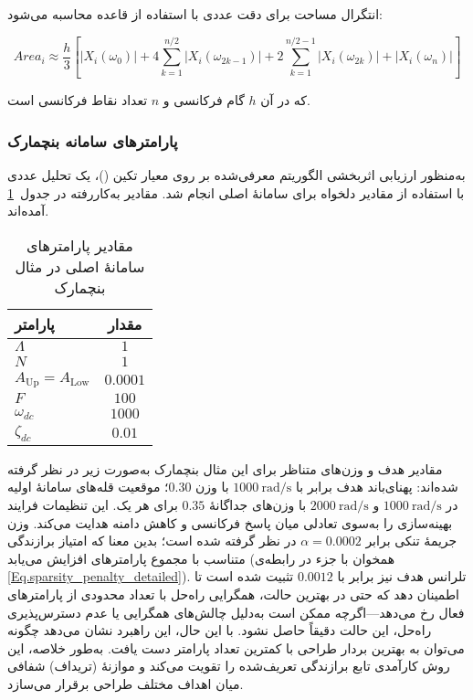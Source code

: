 انتگرال مساحت برای دقت عددی با استفاده از قاعده  محاسبه می‌شود:

\begin{equation}\label{Eq.area_simpson_detailed}
Area_i \approx \frac{h}{3} \left[ |X_i(\omega_0)| + 4\sum_{k=1}^{n/2} |X_i(\omega_{2k-1})| + 2\sum_{k=1}^{n/2-1} |X_i(\omega_{2k})| + |X_i(\omega_n)| \right]
\end{equation}

که در آن $h$ گام فرکانسی و $n$ تعداد نقاط فرکانسی است.

\subsubsection{پارامترهای سامانه بنچمارک}

به‌منظور ارزیابی اثربخشی الگوریتم  معرفی‌شده بر روی معیار تکین ()، یک تحلیل عددی با استفاده از مقادیر دلخواه برای سامانهٔ اصلی انجام شد. مقادیر به‌کاررفته در جدول~\ref{tab:benchmark-main-params} آمده‌اند.

\begin{table}[h!]
\centering
\caption{مقادیر پارامترهای سامانهٔ اصلی در مثال بنچمارک}
\label{tab:benchmark-main-params}
\begin{tabular}{lc}
\hline
\textbf{پارامتر} & \textbf{مقدار} \\
\hline
$\Lambda$ & $1$ \\
$N$ & $1$ \\
$A_{\mathrm{Up}} = A_{\mathrm{Low}}$ & $0.0001$ \\
$F$ & $100$ \\
$\omega_{dc}$ & $1000$ \\
$\zeta_{dc}$ & $0.01$ \\
\hline
\end{tabular}
\end{table}

مقادیر هدف و وزن‌های متناظر برای این مثال بنچمارک به‌صورت زیر در نظر گرفته شده‌اند: پهنای‌باند هدف برابر با $1000~\text{rad/s}$ با وزن $0.30$؛ موقعیت قله‌های سامانهٔ اولیه در $1000~\text{rad/s}$ و $2000~\text{rad/s}$ با وزن‌های جداگانهٔ $0.35$ برای هر یک. این تنظیمات فرایند بهینه‌سازی را به‌سوی تعادلی میان پاسخ فرکانسی و کاهش دامنه هدایت می‌کند. وزن جریمهٔ تنکی برابر $\alpha = 0.0002$ در نظر گرفته شده است؛ بدین معنا که امتیاز برازندگی متناسب با مجموع پارامترهای  افزایش می‌یابد (همخوان با جزء  در رابطه‌ی \eqref{Eq.sparsity_penalty_detailed}). تلرانس هدف نیز برابر با $0.0012$ تثبیت شده است تا اطمینان دهد که حتی در بهترین حالت، همگرایی راه‌حل با تعداد محدودی از پارامترهای  فعال رخ می‌دهد—اگرچه ممکن است به‌دلیل چالش‌های همگرایی یا عدم دسترس‌پذیری راه‌حل، این حالت دقیقاً حاصل نشود. با این حال، این راهبرد نشان می‌دهد چگونه می‌توان به بهترین بردار طراحی  با کمترین تعداد پارامتر دست یافت. به‌طور خلاصه، این روش کارآمدی تابع برازندگی تعریف‌شده را تقویت می‌کند و موازنهٔ (تریداف) شفافی میان اهداف مختلف طراحی  برقرار می‌سازد.

